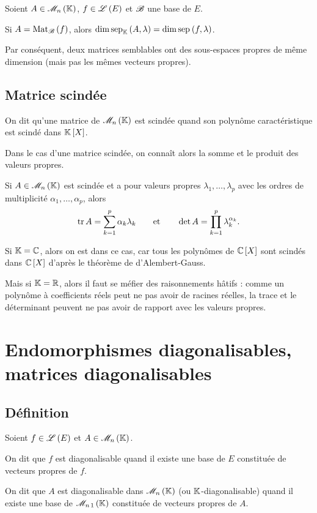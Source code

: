 \begin{prop}
Soient \(A\in\M{n}\), \(f\in\mathscr{L}\left(E\right)\) et \(\mathscr{B}\) une base de \(E\).

Si \(A=\Mat{f}\), alors \(\dim\sep[\K]{A}{\lambda}=\dim\sep{f}{\lambda}\).
\end{prop}

Par conséquent, deux matrices semblables ont des sous-espaces propres de même dimension (mais pas les mêmes vecteurs propres).

\subsection{Matrice scindée}

\begin{defi}
On dit qu'une matrice de \(\M{n}\) est scindée quand son polynôme caractéristique est scindé dans \(\poly\).
\end{defi}

Dans le cas d'une matrice scindée, on connaît alors la somme et le produit des valeurs propres.

\begin{prop}
Si \(A\in\M{n}\) est scindée et a pour valeurs propres \(\lambda_1,\dots,\lambda_p\) avec les ordres de multiplicité \(\alpha_1,\dots,\alpha_p\), alors \[\operatorname{tr} A=\sum_{k=1}^p\alpha_k\lambda_k\qquad\text{et}\qquad\det A=\prod_{k=1}^p\lambda_k^{\alpha_k}.\]
\end{prop}

Si \(\mathbb{K}=\mathbb{C}\), alors on est dans ce cas, car tous les polynômes de \(\poly[\C]\) sont scindés dans \(\poly[\C]\) d'après le théorème de d'Alembert-Gauss.

Mais si \(\mathbb{K}=\mathbb{R}\), alors il faut se méfier des raisonnements hâtifs : comme un polynôme à coefficients réels peut ne pas avoir de racines réelles, la trace et le déterminant peuvent ne pas avoir de rapport avec les valeurs propres.

\section{Endomorphismes diagonalisables, matrices diagonalisables}

\subsection{Définition}

\begin{defi}
Soient \(f\in\mathscr{L}\left(E\right)\) et \(A\in\M{n}\).

On dit que \(f\) est diagonalisable quand il existe une base de \(E\) constituée de vecteurs propres de \(f\).

On dit que \(A\) est diagonalisable dans \(\M{n}\) (ou \(\mathbb{K}\)-diagonalisable) quand il existe une base de \(\M{n\,1}\) constituée de vecteurs propres de \(A\).
\end{defi}

